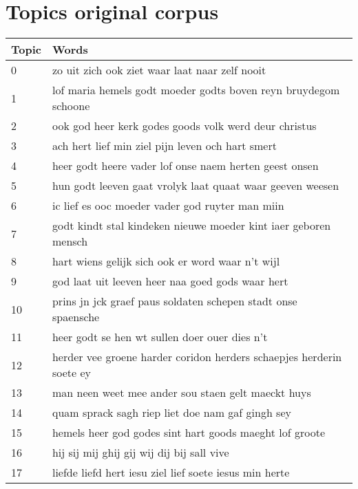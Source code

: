 \chapter{Topics original corpus}

\begin{longtable}{p{} | p{}}
	\toprule
	Topic & Words \\       
	\midrule                                                   
	0     & zo uit zich ook ziet waar laat naar zelf nooit                       \\
	1     & lof maria hemels godt moeder godts boven reyn bruydegom schoone      \\
	2     & ook god heer kerk godes goods volk werd deur christus                \\
	3     & ach hert lief min ziel pijn leven och hart smert                     \\
	4     & heer godt heere vader lof onse naem herten geest onsen               \\
	5     & hun godt leeven gaat vrolyk laat quaat waar geeven weesen            \\
	6     & ic lief es ooc moeder vader god ruyter man miin                      \\
	7     & godt kindt stal kindeken nieuwe moeder kint iaer geboren mensch      \\
	8     & hart wiens gelijk sich ook er word waar n't wijl                     \\
	9     & god laat uit leeven heer naa goed gods waar hert                     \\
	10    & prins jn jck graef paus soldaten schepen stadt onse spaensche        \\
	11    & heer godt se hen wt sullen doer ouer dies n't                        \\
	12    & herder vee groene harder coridon herders schaepjes herderin soete ey \\
	13    & man neen weet mee ander sou staen gelt maeckt huys                   \\
	14    & quam sprack sagh riep liet doe nam gaf gingh sey                     \\
	15    & hemels heer god godes sint hart goods maeght lof groote              \\
	16    & hij sij mij ghij gij wij dij bij sall vive                           \\
	17    & liefde liefd hert iesu ziel lief soete iesus min herte               \\

\end{longtable}
